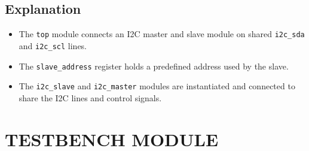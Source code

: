 \documentclass[a4paper,12pt]{report}
\begin{document}
\subsection{Explanation}
\begin{itemize}
    \item The \texttt{top} module connects an I2C master and slave module on shared \texttt{i2c\_sda} and \texttt{i2c\_scl} lines.
    \item The \texttt{slave\_address} register holds a predefined address used by the slave.
    \item The \texttt{i2c\_slave} and \texttt{i2c\_master} modules are instantiated and connected to share the I2C lines and control signals.
\end{itemize}
\newpage
\section{TESTBENCH MODULE}
\end{document}
